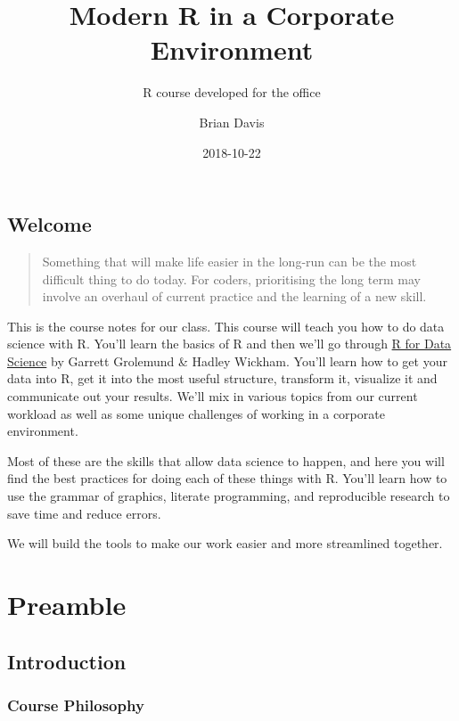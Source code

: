 \documentclass[]{book}
\title{Modern R in a Corporate Environment}
\subtitle{R course developed for the office}
\author{Brian Davis}
\date{2018-10-22}
\theoremstyle{definition}
\theoremstyle{definition}
\theoremstyle{definition}
\theoremstyle{remark}
\begin{document}
\maketitle

{
\setcounter{tocdepth}{1}
\tableofcontents
}
\chapter*{Welcome}\label{welcome}

\begin{quote}
Something that will make life easier in the long-run can be the most
difficult thing to do today. For coders, prioritising the long term may
involve an overhaul of current practice and the learning of a new skill.
\end{quote}

This is the course notes for our class. This course will teach you how
to do data science with R. You'll learn the basics of R and then we'll
go through \href{http://r4ds.had.co.nz/index.html}{R for Data Science}
by Garrett Grolemund \& Hadley Wickham. You'll learn how to get your
data into R, get it into the most useful structure, transform it,
visualize it and communicate out your results. We'll mix in various
topics from our current workload as well as some unique challenges of
working in a corporate environment.

Most of these are the skills that allow data science to happen, and here
you will find the best practices for doing each of these things with R.
You'll learn how to use the grammar of graphics, literate programming,
and reproducible research to save time and reduce errors.

We will build the tools to make our work easier and more streamlined
together.

\part{Preamble}\label{part-preamble}

\chapter{Introduction}\label{preamble-intro}

\section{Course Philosophy}\label{course-philosophy}
\end{document}

